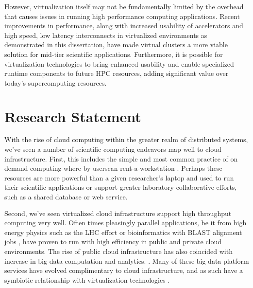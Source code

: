 However, virtualization itself may not be fundamentally limited by the overhead that causes issues in running high performance computing applications. Recent improvements in performance, along with increased usability of accelerators and high speed, low latency interconnects in virtualized environments as demonstrated in this dissertation, have made virtual clusters a more viable solution for mid-tier scientific applications.  Furthermore, it is possible for  virtualization technologies to bring enhanced usability and enable specialized runtime components to future HPC resources, adding significant value over today's supercomputing resources.   



\section{Research Statement}
\label{sec:stmt}


With the rise of cloud computing within the greater realm of distributed systems, we've seen a number of scientific computing endeavors map well to cloud infrastructure. First, this includes the simple and most common practice of on demand computing where by userscan rent-a-workstation \cite{kondo2009cost}. Perhaps these resources are more powerful than a given researcher's laptop and used to run their scientific applications or support greater laboratory collaborative efforts, such as a shared database or web service. 

Second, we've seen virtualized cloud infrastructure support high throughput computing very well. Often times pleasingly parallel applications, be it from high energy physics such as the LHC effort \cite{buncic2010cernvm, bell2015scaling} or bioinformatics with BLAST alignment jobs \cite{menon2012cloud}, have proven to run with high efficiency in public and private cloud environments. The rise of public cloud infrastructure has also coincided with increase in big data computation and analytics.
.
Many of these big data platform services have evolved complimentary to cloud infrastructure, and as such have a symbiotic relationship with virtualization technologies \cite{gunarathne2010mapreduce}.  

